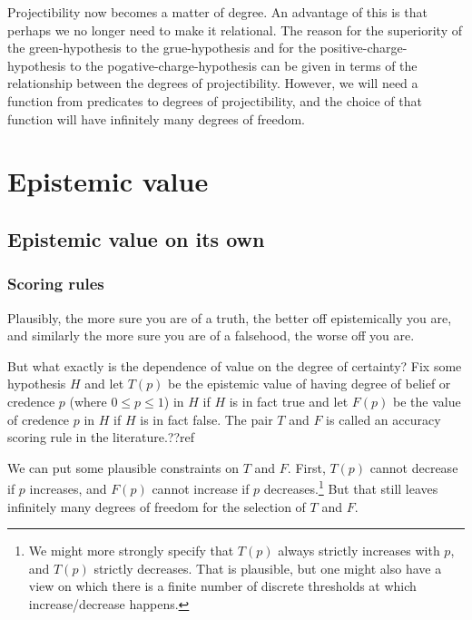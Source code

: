Projectibility now becomes a matter of degree. An advantage of this is that perhaps we no longer need to make it relational.
The reason for the superiority of the green-hypothesis to the grue-hypothesis and for the positive-charge-hypothesis to the
pogative-charge-hypothesis can be given in terms of the relationship between the degrees of projectibility. However, 
we will need a function from predicates to degrees of projectibility, and the choice of that function will have infinitely
many degrees of freedom.

\section{Epistemic value}
\subsection{Epistemic value on its own}
\subsubsection{Scoring rules}
Plausibly, the more sure you are of a truth, the better off epistemically you are, and similarly the more sure you are
of a falsehood, the worse off you are. 

But what exactly is the dependence of value on the degree of certainty? Fix some hypothesis $H$ and let $T(p)$ be the epistemic value of 
having degree of belief or credence $p$ (where $0\le p\le 1$) in $H$ if $H$ is in fact true and let $F(p)$ be the value of credence
$p$ in $H$ if $H$ is in fact false. The pair $T$ and $F$ is called an accuracy scoring rule in the literature.??ref 

We can put some plausible constraints on $T$ and $F$. First, $T(p)$ cannot decrease if $p$ increases,
and $F(p)$ cannot increase if $p$ decreases.\footnote{We might more strongly specify that $T(p)$ always strictly increases with $p$, and $T(p)$
strictly decreases. That is
plausible, but one might also have a view on which there is a finite number of discrete thresholds at which increase/decrease happens.}
But that still leaves infinitely many degrees of freedom for the selection of $T$ and $F$.

